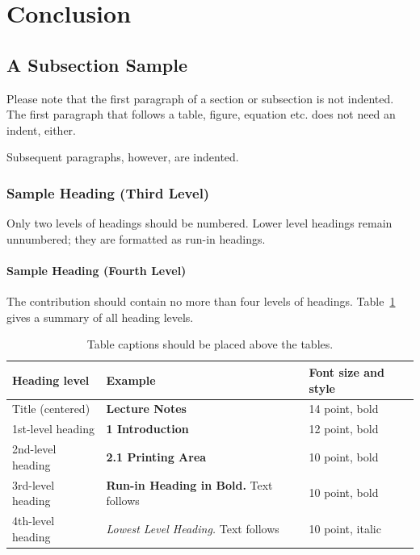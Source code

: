 \documentclass[runningheads]{llncs}
\begin{document}
\section{Conclusion}








\subsection{A Subsection Sample}
Please note that the first paragraph of a section or subsection is
not indented. The first paragraph that follows a table, figure,
equation etc. does not need an indent, either.

Subsequent paragraphs, however, are indented.

\subsubsection{Sample Heading (Third Level)} Only two levels of
headings should be numbered. Lower level headings remain unnumbered;
they are formatted as run-in headings.

\paragraph{Sample Heading (Fourth Level)}
The contribution should contain no more than four levels of
headings. Table~\ref{tab1} gives a summary of all heading levels.

\begin{table}
\caption{Table captions should be placed above the
tables.}\label{tab1}
\begin{tabular}{|l|l|l|}
\hline
Heading level &  Example & Font size and style\\
\hline
Title (centered) &  {\Large\bfseries Lecture Notes} & 14 point, bold\\
1st-level heading &  {\large\bfseries 1 Introduction} & 12 point, bold\\
2nd-level heading & {\bfseries 2.1 Printing Area} & 10 point, bold\\
3rd-level heading & {\bfseries Run-in Heading in Bold.} Text follows & 10 point, bold\\
4th-level heading & {\itshape Lowest Level Heading.} Text follows & 10 point, italic\\
\hline
\end{tabular}
\end{table}
\end{document}
